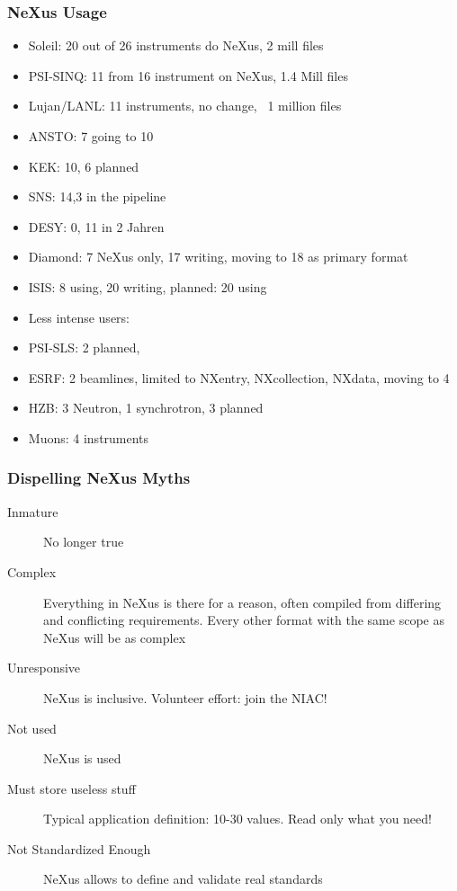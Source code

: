 \documentclass{beamer}
\begin{document}
\begin{frame}
\frametitle{NeXus Usage}
\begin{itemize}
\item Soleil: 20 out of 26 instruments do NeXus, 2 mill files
\item PSI-SINQ: 11 from 16 instrument on NeXus, 1.4 Mill files
\item Lujan/LANL: 11 instruments, no change, ~1 million files
\item ANSTO: 7 going to 10
\item KEK: 10, 6 planned
\item SNS: 14,3 in the pipeline
\item DESY: 0, 11 in 2 Jahren
\item Diamond: 7 NeXus only, 17 writing, moving to 18 as primary format
\item ISIS: 8 using, 20 writing, planned: 20 using
\item {\color{blue}Less intense users:}
\item PSI-SLS: 2 planned, 
\item ESRF: 2 beamlines, limited to NXentry, NXcollection, NXdata, moving to 4
\item HZB: 3 Neutron, 1 synchrotron, 3 planned 
\item Muons: 4 instruments
\end{itemize}
\end{frame}





\begin{frame}
\frametitle{Dispelling NeXus Myths}
\begin{description}
\item[{\color{blue} Inmature}] No longer true
\item[{\color{blue}Complex}] Everything in NeXus is there for a reason, often compiled from differing 
      and conflicting requirements. Every other format with the same scope as 
      NeXus will be as complex
\item[{\color{blue} Unresponsive}] NeXus is inclusive. Volunteer 
  effort: join the NIAC!
\item[{\color{blue} Not used}] NeXus is used
\item[{\color{blue}Must store useless stuff}] Typical application definition: 10-30 values. 
 Read only what you need! 
\item[{\color{blue} Not Standardized Enough}] NeXus allows to define and validate real standards
\end{description}
\end{frame}
\end{document}

